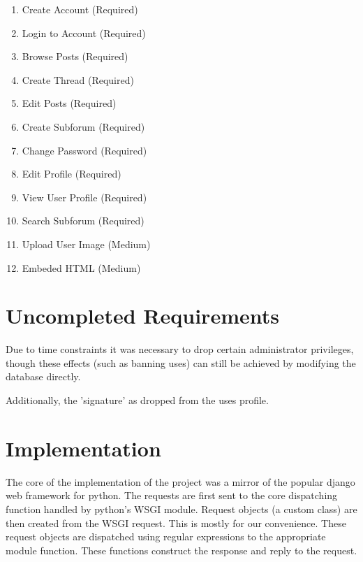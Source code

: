 \documentclass[12pt]{scrartcl}
\begin{document}
\begin{enumerate}
\item Create Account (Required)
\item Login to  Account (Required)
\item Browse Posts (Required)
\item Create Thread (Required)
\item Edit Posts (Required)
\item Create Subforum (Required)
\item Change Password (Required)
\item Edit Profile (Required)
\item View User Profile (Required)
\item Search Subforum (Required)
\item Upload User Image (Medium)
\item Embeded HTML (Medium)
\end{enumerate}

\section{Uncompleted Requirements}

Due to time constraints it was necessary to drop certain administrator
privileges, though these effects (such as banning uses) can still be
achieved by modifying the database directly.

Additionally, the 'signature' as dropped from the uses profile.

\section{Implementation}

The core of the implementation of the project was a mirror of the popular
django web framework for python. The requests are first sent to the core
dispatching function handled by python's WSGI module. Request objects
(a custom class) are then created from the WSGI request. This is mostly for
our convenience. These request objects are dispatched using regular expressions
to the appropriate module function. These functions construct the response
and reply to the request.
\end{document}
